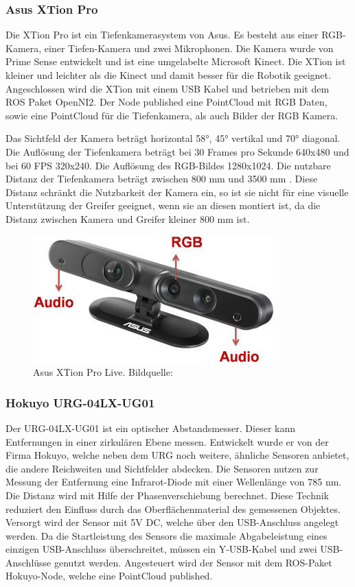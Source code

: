\subsubsection{Asus XTion Pro}
Die XTion Pro ist ein Tiefenkamerasystem von Asus. Es besteht aus einer RGB-Kamera, einer Tiefen-Kamera und zwei Mikrophonen. Die Kamera wurde von Prime Sense entwickelt und ist eine umgelabelte Microsoft Kinect. Die XTion ist kleiner und leichter als die Kinect und damit besser für die Robotik geeignet. Angeschlossen wird die XTion mit einem USB Kabel und betrieben mit dem ROS Paket OpenNI2. Der Node published eine PointCloud mit RGB Daten, sowie eine PointCloud für die Tiefenkamera, als auch Bilder der RGB Kamera.

Das Sichtfeld der Kamera beträgt horizontal 58°, 45° vertikal und 70° diagonal. Die Auflösung der Tiefenkamera beträgt bei 30 Frames pro Sekunde 640x480 und bei 60 FPS 320x240. Die Auflösung des RGB-Bildes 1280x1024. Die nutzbare Distanz der Tiefenkamera beträgt zwischen 800 mm und 3500 mm \citep{asus2015}. Diese Distanz schränkt die Nutzbarkeit der Kamera ein, so ist sie nicht für eine visuelle Unterstützung der Greifer geeignet, wenn sie an diesen montiert ist, da die Distanz zwischen Kamera und Greifer kleiner 800 mm ist.

\begin{figure}[H]
	\centering
	\includegraphics[scale=0.8]{fig/xtion1}   
	\caption[Asus Xtion Pro Live]{Asus XTion Pro Live. Bildquelle: \cite{asus2015}}
	\label{fig:aufbau-xtion}
\end{figure}

\subsubsection{Hokuyo URG-04LX-UG01}
Der URG-04LX-UG01 ist ein optischer Abstandsmesser. Dieser kann Entfernungen in einer zirkulären Ebene messen. Entwickelt wurde er von der Firma Hokuyo, welche neben dem URG noch weitere, ähnliche Sensoren anbietet, die andere Reichweiten und Sichtfelder abdecken. Die Sensoren nutzen zur Messung der Entfernung eine Infrarot-Diode mit einer Wellenlänge von 785 nm. Die Distanz wird mit Hilfe der Phasenverschiebung berechnet. Diese Technik reduziert den Einfluss durch das Oberflächenmaterial des gemessenen Objektes. Versorgt wird der Sensor mit 5V DC, welche über den USB-Anschluss angelegt werden. Da die Startleistung des Sensors die maximale Abgabeleistung eines einzigen USB-Anschluss überschreitet, müssen ein Y-USB-Kabel und zwei USB-Anschlüsse genutzt werden. Angesteuert wird der Sensor mit dem ROS-Paket Hokuyo-Node, welche eine PointCloud published.

